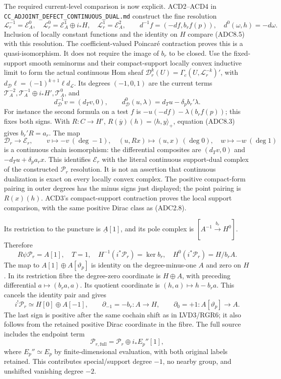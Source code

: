 The required current-level comparison is now explicit. ACD2--ACD4 in
\nolinkurl{CC_ADJOINT_DEFECT_CONTINUOUS_DUAL.md} construct the fine
resolution \[
\mathscr L_r^{-1}=\mathscr E_A^0,\quad
\mathscr L_r^0=\mathscr E_A^1\oplus i_*H,\quad
\mathscr L_r^1=\mathscr E_A^2,\qquad
d^{-1}f=(-df,b_rf(p)),\quad d^0(\omega,h)=-d\omega.
\tag{ADC8.5a}
\] Inclusion of locally constant functions and the identity on \(H\)
compare (ADC8.5) with this resolution. The coefficient-valued Poincaré
contraction proves this is a quasi-isomorphism. It does not require the
image of \(b_r\) to be closed. Use the fixed-support smooth seminorms
and their compact-support locally convex inductive limit to form the
actual continuous Hom sheaf
\(\mathscr D_r^k(U)=\Gamma_c(U,\mathscr L_r^{-k})'\), with
\(d_{\mathscr D}\ell=(-1)^{k+1}\ell d_{\mathscr L}\). Its degrees
\((-1,0,1)\) are the current terms
\(\mathscr T_A^{-2},\mathscr T_A^{-1}\oplus i_*H',\mathscr T_A^0\), and
\[
d_{\mathscr D}^{-1}v=(d_Tv,0),\qquad
d_{\mathscr D}^{0}(u,\lambda)=d_Tu-\delta_pb_r'\lambda.
\tag{ADC8.5b}
\] For instance the second formula on a test \(f\) is
\(-u(-df)-\lambda(b_rf(p))\); this fixes both signs. With \(R:C\to H'\),
\(R(\overline y)(h)=\langle h,y\rangle_+\), equation (ADC8.3) gives
\(b_r'R=a_r\). The map \[
\mathscr D_r\longrightarrow\mathscr E_r,\qquad
v\mapsto-v\ (\deg-1),\quad
(u,Rx)\mapsto(u,x)\ (\deg0),\quad
w\mapsto-w\ (\deg1)
\tag{ADC8.5c}
\] is a continuous chain isomorphism: the differential composites are
\((d_Tv,0)\) and \(-d_Tu+\delta_pa_rx\). This identifies
\(\mathscr E_r\) with the literal continuous support-dual complex of the
constructed \(\mathscr P_r\) resolution. It is not an assertion that
continuous dualization is exact on every locally convex complex. The
positive compact-form pairing in outer degrees has the minus signs just
displayed; the point pairing is \(R(x)(h)\). ACD3's compact-support
contraction proves the local support comparison, with the same positive
Dirac class as (ADC2.8).

Its restriction to the puncture is \(\underline A[1]\), and its pole
complex is \([A^{-1}\xrightarrow{b_r}H^0]\). Therefore \[
R\psi\mathscr P_r=A[1],\quad T=1,\quad
H^{-1}(i^*\mathscr P_r)=\ker b_r,\quad
H^0(i^*\mathscr P_r)=H/b_rA.
\tag{ADC8.6}
\] The map to \(A[1]\oplus A[\vartheta_p]\) is identity on the
degree-minus-one \(A\) and zero on \(H\). In its restriction fibre the
degree-zero coordinate is \(H\oplus A\), with preceding differential
\(a\mapsto(b_ra,a)\). Its quotient coordinate is
\((h,a)\mapsto h-b_ra\). This cancels the identity pair and gives \[
i^!\mathscr P_r\simeq H[0]\oplus A[-1],\qquad
\partial_{-1}=-b_r:A\to H,\qquad
\partial_0=+1:A[\vartheta_p]\to A.
\tag{ADC8.7}
\] The last sign is positive after the same cochain shift as in
LVD3/RGR6; it also follows from the retained positive Dirac coordinate
in the fibre. The full source includes the endpoint term \[
\mathscr P_{r,\mathrm{full}}=\mathscr P_r\oplus i_*E_p''[1],
\tag{ADC8.8}
\] where \(E_p''\simeq E_p\) by finite-dimensional evaluation, with both
original labels retained. This contributes special/support degree
\(-1\), no nearby group, and unshifted vanishing degree \(-2\).

